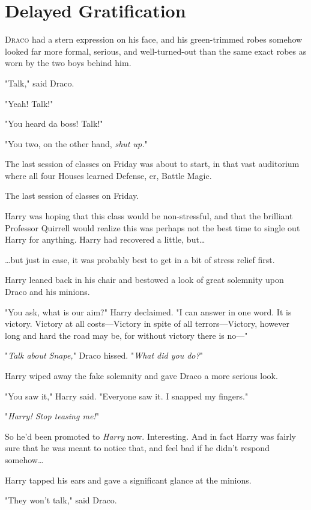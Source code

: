 \chapter{Delayed Gratification}

\lettrine{D}{raco} had a stern expression on his face, and his green-trimmed robes somehow
looked far more formal, serious, and well-turned-out than the same exact robes
as worn by the two boys behind him.

"Talk," said Draco.

"Yeah! Talk!"

"You heard da boss! Talk!"

"You two, on the other hand, \emph{shut up.}"

The last session of classes on Friday was about to start, in that vast
auditorium where all four Houses learned Defense, er, Battle Magic.

The last session of classes on Friday.

Harry was hoping that this class would be non-stressful, and that the brilliant
Professor Quirrell would realize this was perhaps not the best time to single
out Harry for anything. Harry had recovered a little, but{\ldots}

{\ldots}but just in case, it was probably best to get in a bit of stress relief
first.

Harry leaned back in his chair and bestowed a look of great solemnity upon
Draco and his minions.

"You ask, what is our aim?" Harry declaimed. "I can answer in one word. It is
victory. Victory at all costs---Victory in spite of all terrors---Victory,
however long and hard the road may be, for without victory there is no---"

"\emph{Talk about Snape,}" Draco hissed. "\emph{What did you do?}"

Harry wiped away the fake solemnity and gave Draco a more serious look.

"You saw it," Harry said. "Everyone saw it. I snapped my fingers."

"\emph{Harry! Stop teasing me!}"

So he'd been promoted to \emph{Harry} now. Interesting. And in fact Harry was
fairly sure that he was meant to notice that, and feel bad if he didn't respond
somehow{\ldots}

Harry tapped his ears and gave a significant glance at the minions.

"They won't talk," said Draco.

